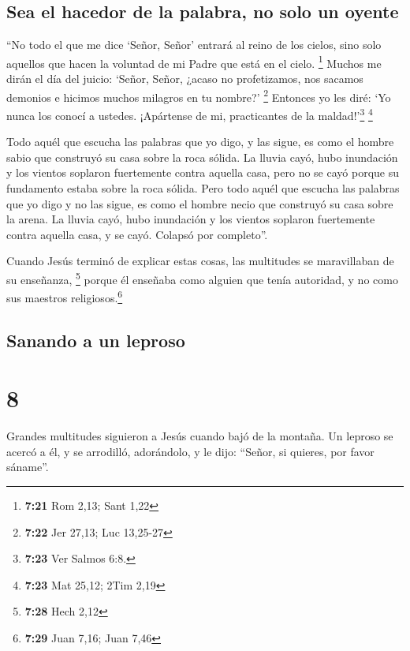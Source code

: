 \hypertarget{sea-el-hacedor-de-la-palabra-no-solo-un-oyente}{%
\subsection{Sea el hacedor de la palabra, no solo un
oyente}\label{sea-el-hacedor-de-la-palabra-no-solo-un-oyente}}

 ``No todo el que me dice `Señor, Señor' entrará al reino
de los cielos, sino solo aquellos que hacen la voluntad de mi Padre que
está en el cielo. \footnote{\textbf{7:21} Rom 2,13; Sant 1,22}
 Muchos me dirán el día del juicio: `Señor, Señor, ¿acaso
no profetizamos, nos sacamos demonios e hicimos muchos milagros en tu
nombre?' \footnote{\textbf{7:22} Jer 27,13; Luc 13,25-27}
 Entonces yo les diré: `Yo nunca los conocí a ustedes.
¡Apártense de mi, practicantes de la maldad!'\footnote{\textbf{7:23} Ver
  Salmos 6:8.} \footnote{\textbf{7:23} Mat 25,12; 2Tim 2,19}

 Todo aquél que escucha las palabras que yo digo, y las
sigue, es como el hombre sabio que construyó su casa sobre la roca
sólida.  La lluvia cayó, hubo inundación y los vientos
soplaron fuertemente contra aquella casa, pero no se cayó porque su
fundamento estaba sobre la roca sólida.  Pero todo aquél
que escucha las palabras que yo digo y no las sigue, es como el hombre
necio que construyó su casa sobre la arena.  La lluvia
cayó, hubo inundación y los vientos soplaron fuertemente contra aquella
casa, y se cayó. Colapsó por completo''.

 Cuando Jesús terminó de explicar estas cosas, las
multitudes se maravillaban de su enseñanza, \footnote{\textbf{7:28} Hech
  2,12}  porque él enseñaba como alguien que tenía
autoridad, y no como sus maestros religiosos.\footnote{\textbf{7:29}
  Juan 7,16; Juan 7,46}

\hypertarget{sanando-a-un-leproso}{%
\subsection{Sanando a un leproso}\label{sanando-a-un-leproso}}

\hypertarget{section-7}{%
\section{8}\label{section-7}}

 Grandes multitudes siguieron a Jesús cuando bajó de la
montaña.  Un leproso se acercó a él, y se arrodilló,
adorándolo, y le dijo: ``Señor, si quieres, por favor sáname''.

